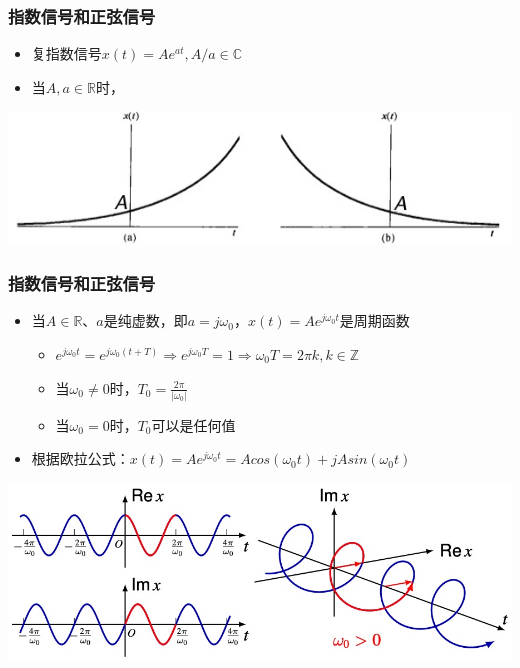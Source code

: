\documentclass[CJKutf8,xcolor=pdftex,dvipsnames,table]{beamer}
\begin{document}
\begin{CJK*}{UTF8}{song}
  \begin{frame}
    \frametitle{指数信号和正弦信号}
    \begin{itemize}
    \item 复指数信号$x(t)=Ae^{at}, A/a \in \mathbb{C}$
    \item 当$A, a \in \mathbb{R}$时，
    \end{itemize}
    \begin{center}
      \includegraphics[scale=.4]{cexp}
    \end{center}  
  \end{frame}  
  
  \begin{frame}
    \frametitle{指数信号和正弦信号}
    \begin{itemize}
    \item 当$A \in \mathbb{R}$、$a$是纯虚数，即$a=j\omega_0$，$x(t)=Ae^{j\omega_{0}t}$是周期函数
    \begin{itemize}
    \item $e^{j\omega_{0}t}=e^{j\omega_{0}(t+T)} \Rightarrow e^{j\omega_{0}T}=1 \Rightarrow \omega_0 T=2\pi k, k \in \mathbb{Z}$
    \item 当$\omega_0 \neq 0$时，$T_0=\frac{2\pi}{|\omega_0|}$
    \item 当$\omega_0=0$时，$T_0$可以是任何值
    \end{itemize}
    \item 根据欧拉公式：$x(t)=Ae^{j\omega_0 t}=Acos(\omega_0 t)+jAsin(\omega_0 t)$
    \end{itemize}
    \begin{center}
      \includegraphics[scale=.4]{csinusoid}
    \end{center}     
  \end{frame}    


\end{CJK*}
\end{document}
